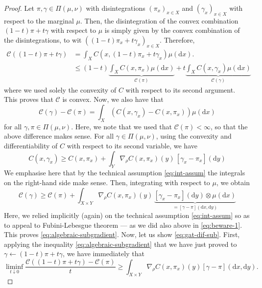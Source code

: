 \documentclass[leqno, 11pt, a4paper]{amsart}
\theoremstyle{definition}
\newcommand{\C}{\mathscr{C}}
\newcommand{\dd}{\mathrm{d}}
\begin{document}
\begin{proof}
	Let $\pi, \gamma \in \Pi(\mu, \nu)$ with disintegrations $(\pi_x)_{x \in X}$ and $(\gamma_x)_{x \in X}$ with respect to the marginal $\mu$. Then, the disintegration of the convex combination $(1-t)\pi + t \gamma$ with respect to $\mu$ is simply given by the convex combination of the disintegrations, to wit $((1-t)\pi_x + t \gamma_x)_{x \in X}$. Therefore,
	\begin{align*}
		\C((1-t)\pi + t \gamma) &= \int_{X} C(x, (1-t)\pi_x + t \gamma_x) \mu(\dd x).
		\\& \leq (1-t) \underbrace{\int_X C(x, \pi_x) \mu(\dd x)}_{\C(\pi)} + t \underbrace{\int_{X} C(x, \gamma_x) \mu(\dd x)}_{\C(\gamma)}
	\end{align*}
	where we used solely the convexity of $C$ with respect to its second argument. This proves that $\C$ is convex. Now, we also have that
	\begin{equation*}
	 \C(\gamma) - \C(\pi) = \int_{X} (C(x, \gamma_x) - C(x, \pi_x))\mu(\dd x)
	\end{equation*}
	for all $\gamma, \pi \in \Pi(\mu, \nu)$. Here, we note that we used that $\C(\pi) < \infty$, so that the above difference makes sense. For all $\gamma \in \Pi(\mu, \nu)$, using the convexity and differentiability of $C$ with respect to its second variable, we have
	\begin{equation}\label{eq:beware-1}
		C(x, \gamma_x) \geq  C(x, \pi_x) + \int_{Y} \nabla_{\rho} C(x, \pi_x)(y) \, [\gamma_{x} - \pi_{x}](\dd y)
	\end{equation}
	We emphasise here that by the technical assumption \eqref{eq:int-assum} the integrals on the right-hand side make sense. 
    Then, integrating with respect to $\mu$, we obtain
	\begin{equation}\label{eq:beware-2}
		 \C(\gamma) \geq \C(\pi) + \int_{X \times Y}  \nabla_\rho C(x, \pi_x)(y) \, \underbrace{[\gamma_x - \pi_x](\dd y) \otimes \mu(\dd x)}_{=  [\gamma - \pi](\dd x,\dd y)}
	\end{equation}
	Here, we relied implicitly (again) on the technical assumption \eqref{eq:int-assum} so as to appeal to Fubini-Lebesgue theorem --- as we did also above in \eqref{eq:beware-1}. This proves \eqref{eq:algebraic-subgradient}. Now, let us show \eqref{eq:gat-dif-sub}. First, applying the inequality \eqref{eq:algebraic-subgradient} that we have just proved to $\gamma \leftarrow (1-t)\pi + t \gamma$, we have immediately that 
	$$
	\liminf_{t \downarrow 0} \frac{\C((1-t)\pi + t \gamma) - \C(\pi)}{t} \geq \int_{X \times Y} \nabla_\rho C(x, \pi_x)(y) [\gamma - \pi](\dd x, \dd y).
$$
\end{proof}
\end{document}
